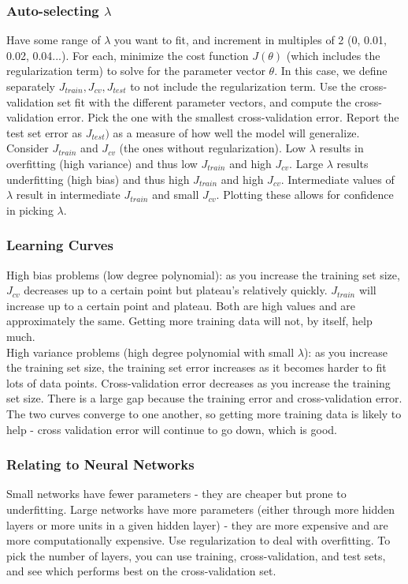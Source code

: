 \documentclass[11pt,letterpaper]{article}
\begin{document}
\subsubsection{Auto-selecting $\lambda$}
Have some range of $\lambda$ you want to fit, and increment in multiples of 2 (0, 0.01, 0.02, 0.04...). For each, minimize the cost function $J(\theta)$ (which includes the regularization term) to solve for the parameter vector $\theta$. In this case, we define separately $J_{train}, J_{cv}, J_{test}$ to not include the regularization term. Use the cross-validation set fit with the different parameter vectors, and compute the cross-validation error. Pick the one with the smallest cross-validation error. Report the test set error as $J_{test})$ as a measure of how well the model will generalize. \\
Consider $J_{train}$ and $J_{cv}$ (the ones without regularization). Low $\lambda$ results in overfitting (high variance) and thus low $J_{train}$ and high $J_{cv}$. Large $\lambda$ results underfitting (high bias) and thus high $J_{train}$ and high $J_{cv}$. Intermediate values of $\lambda$ result in intermediate $J_{train}$ and small $J_{cv}$. Plotting these allows for confidence in picking $\lambda$.
\subsubsection{Learning Curves}
High bias problems (low degree polynomial): as you increase the training set size, $J_{cv}$ decreases up to a certain point but plateau's relatively quickly. $J_{train}$ will increase up to a certain point and plateau. Both are high values and are approximately the same. Getting more training data will not, by itself,   help much.\\
High variance problems (high degree polynomial with small $\lambda$): as you increase the training set size, the training set error increases as it becomes harder to fit lots of data points. Cross-validation error decreases as you increase the training set size. There is a large gap because the training error and cross-validation error. The two curves converge to one another, so getting more training data is likely to help - cross validation error will continue to go down, which is good.
\subsubsection{Relating to Neural Networks}
Small networks have fewer parameters - they are cheaper but prone to underfitting. Large networks have more parameters (either through more hidden layers or more units in a given hidden layer) - they are more expensive and are more computationally expensive. Use regularization to deal with overfitting. To pick the number of layers, you can use training, cross-validation, and test sets, and see which performs best on the cross-validation set.
\end{document}
